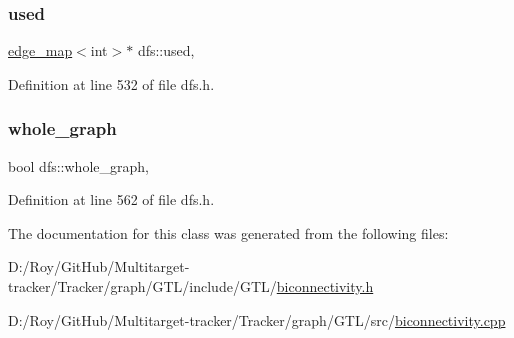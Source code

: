 \subsubsection{\texorpdfstring{used}{used}}
{\footnotesize\ttfamily \mbox{\hyperlink{classedge__map}{edge\+\_\+map}}$<$int$>$$\ast$ dfs\+::used\hspace{0.3cm}{\ttfamily [protected]}, {\ttfamily [inherited]}}



Definition at line 532 of file dfs.\+h.

\mbox{\label{classdfs_ab8342c80ab208ef0e0d781f0769d0d95}} 
\subsubsection{\texorpdfstring{whole\+\_\+graph}{whole\_graph}}
{\footnotesize\ttfamily bool dfs\+::whole\+\_\+graph\hspace{0.3cm}{\ttfamily [protected]}, {\ttfamily [inherited]}}



Definition at line 562 of file dfs.\+h.



The documentation for this class was generated from the following files\+:\begin{DoxyCompactItemize}
\item 
D\+:/\+Roy/\+Git\+Hub/\+Multitarget-\/tracker/\+Tracker/graph/\+G\+T\+L/include/\+G\+T\+L/\mbox{\hyperlink{biconnectivity_8h}{biconnectivity.\+h}}\item 
D\+:/\+Roy/\+Git\+Hub/\+Multitarget-\/tracker/\+Tracker/graph/\+G\+T\+L/src/\mbox{\hyperlink{biconnectivity_8cpp}{biconnectivity.\+cpp}}\end{DoxyCompactItemize}
